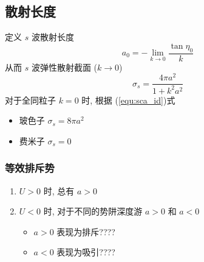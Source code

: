 \documentclass[10pt,a4paper,twocolumn]{article} %
\numberwithin{equation}{section} %
\begin{document}
\subsection{散射长度} %
\label{sub:scattering_length}
定义 $s$ 波散射长度
\begin{equation}
	a_0 = -\lim_{k\to 0} \frac{\tan\eta_0}{k}
\end{equation}
从而 $s$ 波弹性散射截面 ($k\to 0$)
\begin{equation}
	\sigma_s = \frac{4\pi a^2}{1+k^2a^2}
\end{equation}
对于全同粒子 $k=0$ 时, 根据 (\ref{equ:sca_id})式
\begin{itemize}
	\item 玻色子 $\sigma_s = 8\pi a^2$
	\item 费米子 $\sigma_s = 0$
\end{itemize}
\subsubsection{等效排斥势} %
\label{ssub:repulsive_potential}
\begin{enumerate}
	\item $U>0$ 时, 总有 $a>0$
	\item $U<0$ 时, 对于不同的势阱深度游 $a>0$ 和 $a<0$
	\begin{itemize}
		\item $a>0$ 表现为排斥????
		\item $a<0$ 表现为吸引????
	\end{itemize}
\end{enumerate}
\end{document}
